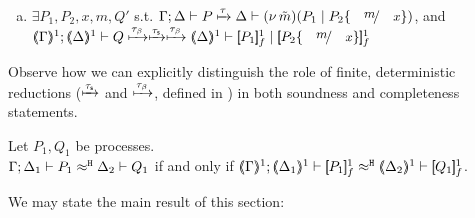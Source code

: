 \documentclass[runningheads]{llncs}
\begin{document}
{{\begin{proposition}
\begin{enumerate}[1.]
\begin{enumerate}[a)]
						\item
							$\exists P_1, P_2, x, m, Q'$ s.t. 
							$\horel{\Gamma}{\Delta}{P}{\hby{\tau}}{\Delta}{\newsp{\tilde{m}}{P_1 \Par P_2\subst{m}{x}} }$, and\\
							$\horel{\tmap{\Gamma}{1}}{\tmap{\Delta}{1}}{Q}{\hby{\btau} \hby{\stau} \hby{\btau}}{\tmap{\Delta}{1}}{\pmapp{P_1}{1}{f} \Par \pmapp{P_2\subst{m}{x}}{1}{f}}$ 

			\end{enumerate}
		    
	\end{enumerate}
\end{proposition}

Observe how we can explicitly distinguish the role of finite, deterministic reductions 
($\xmapsto{\tau_{\mathsf{s}}}$ and $\xmapsto{\tau_{\beta}}$, defined in ) in both soundness and completeness statements.

\begin{proposition}%
	\label{prop:fulla_HOp_to_HO}
	Let $P_1, Q_1$ be \HOp processes. \\
	$\Gamma; \Delta_1 \vdash P_1 \approx^\mathtt{H} \Delta_2 \vdash Q_1$
	if and only if
	$\horel{\tmap{\Gamma}{1}}{\tmap{\Delta_1}{1}}{\pmapp{P_1}{1}{f}}{\hwb}{\tmap{\Delta_2}{1}}{\pmapp{Q_1}{1}{f}}$.
\end{proposition}




We may state the main result of this section: %

}}
\end{document}

